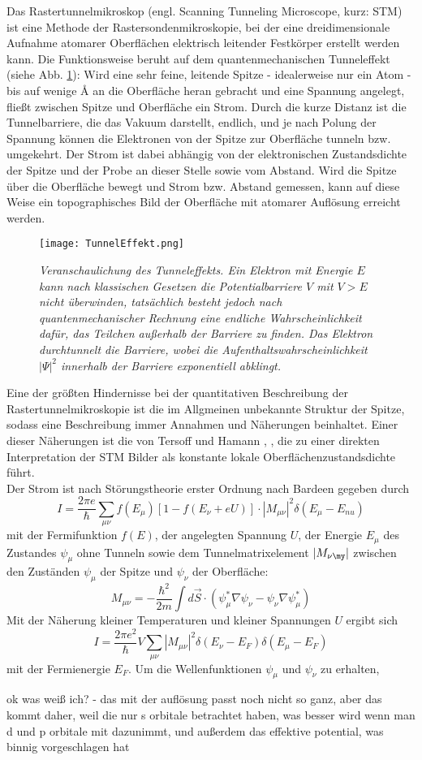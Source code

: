 Das Rastertunnelmikroskop (engl. Scanning Tunneling Microscope, kurz: STM) ist eine Methode der
Rastersondenmikroskopie, bei der eine dreidimensionale Aufnahme atomarer Oberflächen elektrisch
leitender Festkörper erstellt werden kann. Die Funktionsweise beruht auf dem quantenmechanischen
Tunneleffekt (siehe Abb. \ref{tunnel}): Wird eine sehr feine, leitende Spitze - idealerweise nur ein
Atom - bis auf wenige {\AA} an die Oberfläche heran gebracht und eine Spannung angelegt, fließt zwischen Spitze und
Oberfläche ein Strom. Durch die kurze Distanz ist die Tunnelbarriere, die das Vakuum darstellt,
endlich, und je nach Polung der Spannung können die Elektronen von der Spitze zur Oberfläche tunneln bzw.
umgekehrt. Der Strom ist dabei abhängig von der elektronischen Zustandsdichte der Spitze und der
Probe an dieser Stelle sowie vom Abstand. Wird die Spitze über die Oberfläche bewegt und Strom bzw.
Abstand gemessen, kann auf diese Weise ein topographisches Bild der Oberfläche mit atomarer
Auflösung erreicht werden.\\
\begin{figure}[H]
\captionsetup{format=plain}
\centering
\texttt{[image: TunnelEffekt.png]}
\caption{\textit{Veranschaulichung des Tunneleffekts. Ein Elektron mit Energie $E$ kann nach
klassischen Gesetzen die Potentialbarriere $V$ mit $V>E$ nicht überwinden, tatsächlich besteht
jedoch nach quantenmechanischer Rechnung eine endliche Wahrscheinlichkeit dafür, das Teilchen
außerhalb der Barriere zu finden. Das Elektron durchtunnelt die Barriere, wobei die
Aufenthaltswahrscheinlichkeit $|\Psi|^2$ innerhalb der Barriere exponentiell abklingt. }}
\label{tunnel}
\end{figure}
Eine der größten Hindernisse bei der quantitativen Beschreibung der Rastertunnelmikroskopie ist die
im Allgmeinen unbekannte Struktur der Spitze, sodass eine Beschreibung immer Annahmen und Näherungen
beinhaltet. Einer dieser Näherungen ist die von Tersoff und Hamann \cite{Ter83}, \cite{Ter85}, die
zu einer direkten Interpretation der STM Bilder als konstante lokale Oberflächenzustandsdichte führt.\\
Der Strom ist nach Störungstheorie erster Ordnung nach Bardeen \cite{Bar} gegeben durch
\[I=\frac{2\pi e}{\hbar}\sum_{\mu\nu}
f(E_{\mu})[1-f(E_{\nu}+eU)]\cdot|M_{\mu\nu}|^2\delta(E_{\mu}-E_{nu})\]
mit der Fermifunktion $f(E)$, der angelegten Spannung $U$, der Energie
$E_{\mu}$ des Zustandes $\psi_{\mu}$ ohne Tunneln sowie dem Tunnelmatrixelement $|M_{\nu\my}|$
zwischen den Zuständen $\psi_{\mu}$ der Spitze und $\psi_{\nu}$ der Oberfläche:
\[M_{\mu\nu}=-\frac{\hbar^2}{2m}\int d\vec{S}\cdot(\psi_{\mu}^*\nabla\psi_{\nu} -
\psi_{\nu}\nabla\psi_{\mu}^*) \]
Mit der Näherung kleiner Temperaturen und kleiner
Spannungen $U$ ergibt sich
\[I=\frac{2\pi e^2}{\hbar}V\sum_{\mu\nu}|M_{\mu\nu}|^2\delta(E_{\nu}-E_{F}) \delta(E_{\mu}-E_{F})\]
mit der Fermienergie $E_F$. Um die Wellenfunktionen $\psi_{\mu}$ und $\psi_{\nu}$ zu erhalten, 
 
 
 
 
 
ok was weiß ich?
- das mit der auflösung passt noch nicht so ganz, aber das kommt daher, weil die nur s orbitale
betrachtet haben, was besser wird wenn man d und p orbitale mit dazunimmt, und außerdem das
effektive potential, was binnig vorgeschlagen hat
